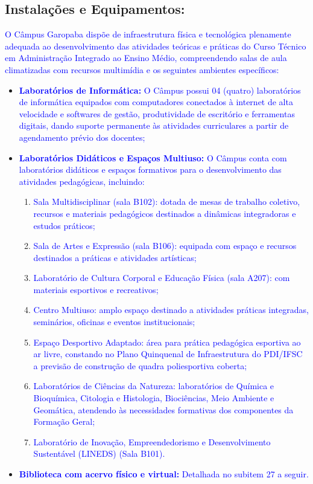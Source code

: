 \documentclass{../../modelos/latex-shared/ifsc-ppc}
\newcommand{\revisao}[1]{\textcolor{blue}{#1}}
\newcommand{\revisao}[1]{#1}
\begin{document}
\subsection{Instalações e Equipamentos:}
\revisao{O Câmpus Garopaba dispõe de infraestrutura física e tecnológica plenamente adequada ao desenvolvimento das atividades teóricas e práticas do Curso Técnico em Administração Integrado ao Ensino Médio, compreendendo salas de aula climatizadas com recursos multimídia e os seguintes ambientes específicos:}
\begin{itemize}
    \item \revisao{\textbf{Laboratórios de Informática:} O Câmpus possui 04 (quatro) laboratórios de informática equipados com computadores conectados à internet de alta velocidade e softwares de gestão, produtividade de escritório e ferramentas digitais, dando suporte permanente às atividades curriculares a partir de agendamento prévio dos docentes;}
    \item \revisao{\textbf{Laboratórios Didáticos e Espaços Multiuso:} O Câmpus conta com laboratórios didáticos e espaços formativos para o desenvolvimento das atividades pedagógicas, incluindo:}
    \begin{enumerate}
        \item \revisao{Sala Multidisciplinar (sala B102): dotada de mesas de trabalho coletivo, recursos e materiais pedagógicos destinados a dinâmicas integradoras e estudos práticos;}
        \item \revisao{Sala de Artes e Expressão (sala B106): equipada com espaço e recursos destinados a práticas e atividades artísticas;}
        \item \revisao{Laboratório de Cultura Corporal e Educação Física (sala A207): com materiais esportivos e recreativos;}
        \item \revisao{Centro Multiuso: amplo espaço destinado a atividades práticas integradas, seminários, oficinas e eventos institucionais;}
        \item \revisao{Espaço Desportivo Adaptado: área para prática pedagógica esportiva ao ar livre, constando no Plano Quinquenal de Infraestrutura do PDI/IFSC a previsão de construção de quadra poliesportiva coberta;}
        \item \revisao{Laboratórios de Ciências da Natureza: laboratórios de Química e Bioquímica, Citologia e Histologia, Biociências, Meio Ambiente e Geomática, atendendo às necessidades formativas dos componentes da Formação Geral;}
        \item \revisao{Laboratório de Inovação, Empreendedorismo e Desenvolvimento Sustentável (LINEDS) (Sala B101).}
    \end{enumerate}
    \item \revisao{\textbf{Biblioteca com acervo físico e virtual:} Detalhada no subitem 27 a seguir.}
\end{itemize}
\end{document}
